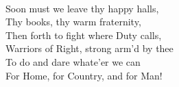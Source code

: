 \documentclass[10pt,b5j]{tarticle} %
\begin{document}
\begin{enumerate}
\begin{minipage}[c]{\blocksize}
        \vspace{\linespace}
        \item~\\
        Soon must we leave thy happy halls,\\
          Thy books, thy warm fraternity,\\
        Then forth to fight where Duty calls,\\
          Warriors of Right, strong arm'd by thee\\
            To do and dare whate'er we can\\
            For Home, for Country, and for Man!
    
    \end{minipage}
\end{enumerate} %
\end{document}
